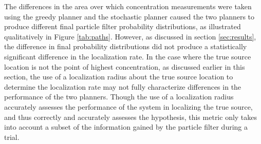 \documentclass[submit, 12pt]{aiaa-pretty-modified}
\begin{document}
\begin{table}[htb]
\centering
{}
\caption{Fraction of possible area covered by the different planning algorithms.}
\label{tab:paths}
\end{table}

The differences in the area over which concentration measurements were
taken using the greedy planner and the stochastic planner caused the
two planners
to produce different final particle filter probability distributions,
as illustrated qualitatively in Figure \ref{tab:paths}.  However, as
discussed in section \ref{sec:results}, the difference in final
probability distributions did not produce a statistically significant
difference in the localization rate.  In the case where the true source location is
not the point of highest concentration, as discussed earlier in this section, the use of a localization radius about
the true source location
to determine the localization rate may not fully characterize
differences in the performance of the two planners.  Though the use of a
localization radius accurately
assesses the performance of the system in localizing the true source,
and thus correctly and accurately assesses the hypothesis, this metric only takes
into account a subset of the information gained by the particle filter
during a trial.
\end{document}
